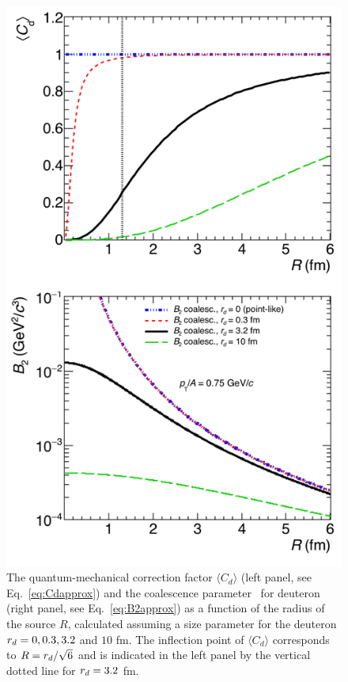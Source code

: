 \begin{figure}[ht]
\begin{center}
\includegraphics[width=1\columnwidth]{../theory_coalescence_Cd_B2_vert.png}
\caption{{The quantum-mechanical correction factor $\langle C_{d} \rangle$ (left panel, see Eq.~\ref{eq:Cdapprox}) and the coalescence parameter \btwo~for deuteron (right panel, see Eq.~\ref{eq:B2approx}) as a function of the radius of the source $R$, calculated assuming a size parameter for the deuteron $r_{d} = 0, 0.3, 3.2$ and $10$ fm. The inflection point of $\langle C_{d} \rangle$ corresponds to $R = r_{d}/\sqrt{6}$ and is indicated in the left panel by the vertical dotted line for $r_{d} = 3.2$ fm.}}
\label{fig:radiusDependence}
\end{center}
\end{figure}

